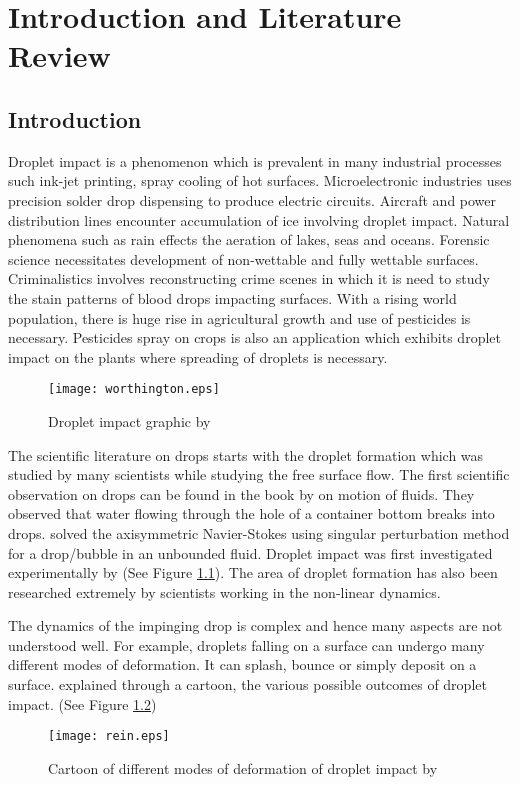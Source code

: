 
\chapter{Introduction and Literature Review}
\section{Introduction}
Droplet impact is a phenomenon which is prevalent in many industrial processes such ink-jet printing, 
spray cooling of hot surfaces. Microelectronic industries uses precision solder drop dispensing to produce
electric circuits. Aircraft and power distribution lines encounter accumulation of ice involving droplet impact.
Natural phenomena such as rain effects the aeration of lakes, seas and oceans. 
Forensic science necessitates development of non-wettable and fully wettable surfaces. Criminalistics involves
reconstructing crime scenes in which it is need to study the stain patterns of blood drops impacting surfaces.
With a rising world population, there is huge rise in agricultural growth and use of pesticides is necessary. Pesticides spray 
on crops is also an application which exhibits droplet impact on the plants where spreading of droplets is necessary. 
\begin{figure}[tbp]
 \texttt{[image: worthington.eps]}
 \caption{Droplet impact graphic by \cite{Worthington1908}}
\label{Fig:Worthington}
\end{figure}


The scientific literature on drops starts with the droplet formation which was studied by many scientists while studying the
free surface flow. The first scientific observation on drops can be found in the book by \cite{Mariotte1700} on motion of  
fluids. They observed that water flowing through the hole of a container bottom breaks into drops. \cite{Taylor1963} solved the  axisymmetric Navier-Stokes  using
singular perturbation method for a drop/bubble in an unbounded fluid. Droplet impact was first investigated experimentally by \cite{Worthington1908} (See Figure \ref{Fig:Worthington}).
The area of droplet formation has also been researched extremely by scientists working in the non-linear dynamics.

The dynamics of the impinging drop is complex and hence many aspects are not understood well. For example, droplets falling
on a surface can undergo many different modes of deformation. It can splash, bounce or simply deposit on a surface. \cite{Rein2002} 
explained through a cartoon, the various possible outcomes of droplet impact. (See Figure \ref{Fig:rein})

\begin{figure}[tbp]
 \texttt{[image: rein.eps]}
 \caption[Different modes of deformation of droplet impact]{Cartoon of different modes of deformation of droplet impact by \cite{Rein2002} }
 \label{Fig:rein}
\end{figure}
